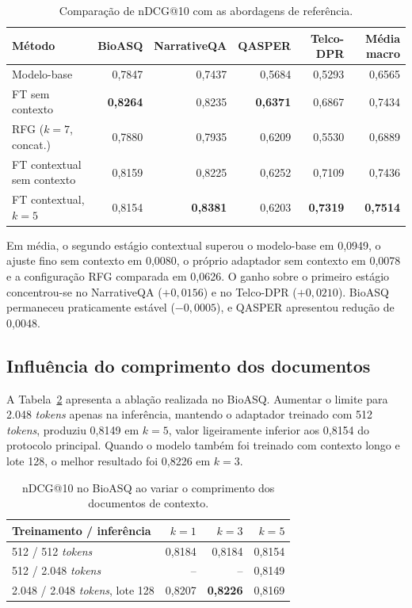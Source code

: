 \begin{table}[htbp]
    \centering
    \caption{Comparação de nDCG@10 com as abordagens de referência.}
    \label{tab:ctx-emb-comparacao}
    \begin{tabular}{lrrrrr}
        \toprule
        Método & BioASQ & NarrativeQA & QASPER & Telco-DPR & Média macro \\
        \midrule
        Modelo-base & 0,7847 & 0,7437 & 0,5684 & 0,5293 & 0,6565 \\
        FT sem contexto & \textbf{0,8264} & 0,8235 & \textbf{0,6371} & 0,6867 & 0,7434 \\
        RFG ($k=7$, concat.) & 0,7880 & 0,7935 & 0,6209 & 0,5530 & 0,6889 \\
        FT contextual sem contexto & 0,8159 & 0,8225 & 0,6252 & 0,7109 & 0,7436 \\
        FT contextual, $k=5$ & 0,8154 & \textbf{0,8381} & 0,6203 & \textbf{0,7319} & \textbf{0,7514} \\
        \bottomrule
    \end{tabular}
\end{table}

Em média, o segundo estágio contextual superou o modelo-base em 0,0949, o ajuste fino sem contexto em 0,0080, o próprio adaptador sem contexto em 0,0078 e a configuração RFG comparada em 0,0626. O ganho sobre o primeiro estágio concentrou-se no NarrativeQA ($+0,0156$) e no Telco-DPR ($+0,0210$). BioASQ permaneceu praticamente estável ($-0,0005$), e QASPER apresentou redução de 0,0048.

\subsection{Influência do comprimento dos documentos}

A Tabela~\ref{tab:ctx-emb-contexto-longo} apresenta a ablação realizada no BioASQ. Aumentar o limite para 2.048 \textit{tokens} apenas na inferência, mantendo o adaptador treinado com 512 \textit{tokens}, produziu 0,8149 em $k=5$, valor ligeiramente inferior aos 0,8154 do protocolo principal. Quando o modelo também foi treinado com contexto longo e lote 128, o melhor resultado foi 0,8226 em $k=3$.

\begin{table}[htbp]
    \centering
    \caption{nDCG@10 no BioASQ ao variar o comprimento dos documentos de contexto.}
    \label{tab:ctx-emb-contexto-longo}
    \begin{tabular}{lrrr}
        \toprule
        Treinamento / inferência & $k=1$ & $k=3$ & $k=5$ \\
        \midrule
        512 / 512 \textit{tokens} & 0,8184 & 0,8184 & 0,8154 \\
        512 / 2.048 \textit{tokens} & -- & -- & 0,8149 \\
        2.048 / 2.048 \textit{tokens}, lote 128 & 0,8207 & \textbf{0,8226} & 0,8169 \\
        \bottomrule
    \end{tabular}
\end{table}

